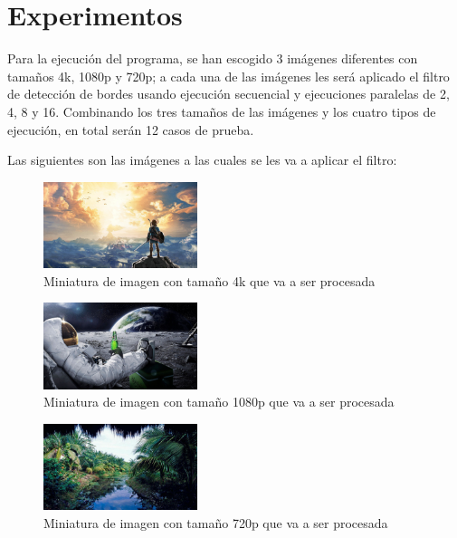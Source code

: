 \section{Experimentos}

Para la ejecución del programa, se han escogido 3 imágenes diferentes con tamaños 4k, 1080p y 720p; a cada una de las imágenes les será aplicado el filtro de detección de bordes usando ejecución secuencial y ejecuciones paralelas de 2, 4, 8 y 16. Combinando los tres tamaños de las imágenes y los cuatro tipos de ejecución, en total serán 12 casos de prueba.

Las siguientes son las imágenes a las cuales se les va a aplicar el filtro:

\begin{figure}[H]
    \centering
    \includegraphics[width=0.4\textwidth]{../plots/4k.jpg}
    \caption{Miniatura de imagen con tamaño 4k que va a ser procesada}
\end{figure}

\begin{figure}[H]
    \centering
    \includegraphics[width=0.4\textwidth]{../plots/1080p.jpg}
    \caption{Miniatura de imagen con tamaño 1080p que va a ser procesada}
\end{figure}

\begin{figure}[H]
    \centering
    \includegraphics[width=0.4\textwidth]{../plots/720p.jpg}
    \caption{Miniatura de imagen con tamaño 720p que va a ser procesada}
\end{figure}

